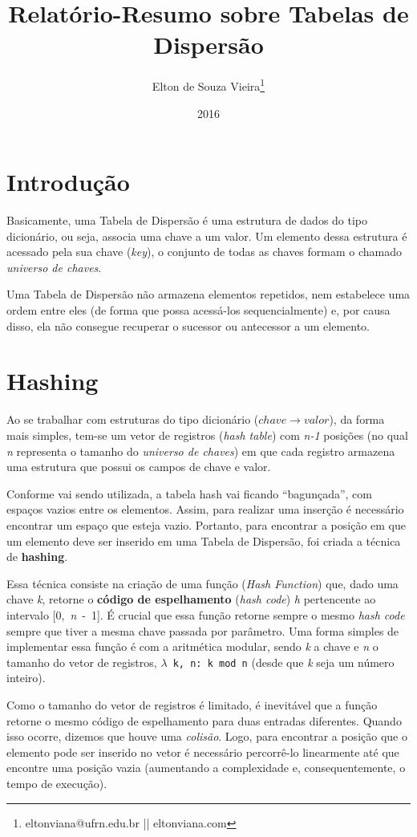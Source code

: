 \documentclass[12pt,openright,oneside,a4paper,english,brazil]{abntex2}
\author{Elton de Souza Vieira\thanks{eltonviana@ufrn.edu.br || eltonviana.com}}
\title{Relatório-Resumo sobre Tabelas de Dispersão}
\date{2016}
\newcommand{\code}[1]{\colorbox{codegray}{\texttt{#1}}}
\begin{document}
\imprimircapa

\section*{Introdução}
    Basicamente, uma Tabela de Dispersão é uma estrutura de dados do tipo dicionário, ou seja, associa uma chave a um valor.
    Um elemento dessa estrutura é acessado pela sua chave (\textit{key}), o conjunto de todas as chaves formam o chamado \textit{universo de chaves}.

    Uma Tabela de Dispersão não armazena elementos repetidos, nem estabelece uma ordem entre eles (de forma que possa acessá-los sequencialmente) e, por causa disso, ela não consegue recuperar o sucessor ou antecessor a um elemento.

\section*{Hashing}
    Ao se trabalhar com estruturas do tipo dicionário (${chave}\rightarrow{valor}$), da forma mais simples, tem-se um vetor de registros (\textit{hash table}) com \textit{n-1} posições (no qual \textit{n} representa o tamanho do \textit{universo de chaves}) em que cada registro armazena uma estrutura que possui os campos de chave e valor.

    Conforme vai sendo utilizada, a tabela hash vai ficando ``bagunçada'', com espaços vazios entre os elementos. Assim, para realizar uma inserção é necessário encontrar um espaço que esteja vazio.
    Portanto, para encontrar a posição em que um elemento deve ser inserido em uma Tabela de Dispersão, foi criada a técnica de \textbf{hashing}.

    Essa técnica consiste na criação de uma função (\textit{Hash Function}) que, dado uma chave \textit{k}, retorne o \textbf{código de espelhamento} (\textit{hash code}) \textit{h} pertencente ao intervalo [0,~\textit{n}~-~1].
    É crucial que essa função retorne sempre o mesmo \textit{hash code} sempre que tiver a mesma chave passada por parâmetro.
    Uma forma simples de implementar essa função é com a aritmética modular, sendo \textit{k} a chave e \textit{n} o tamanho do vetor de registros, \code{$\lambda$~k,~n:~k~mod~n} (desde que \textit{k} seja um número inteiro).

    Como o tamanho do vetor de registros é limitado, é inevitável que a função retorne o mesmo código de espelhamento para duas entradas diferentes.
    Quando isso ocorre, dizemos que houve uma \textit{colisão}.
    Logo, para encontrar a posição que o elemento pode ser inserido no vetor é necessário percorrê-lo linearmente até que encontre uma posição vazia (aumentando a complexidade e, consequentemente, o tempo de execução).
\end{document}

